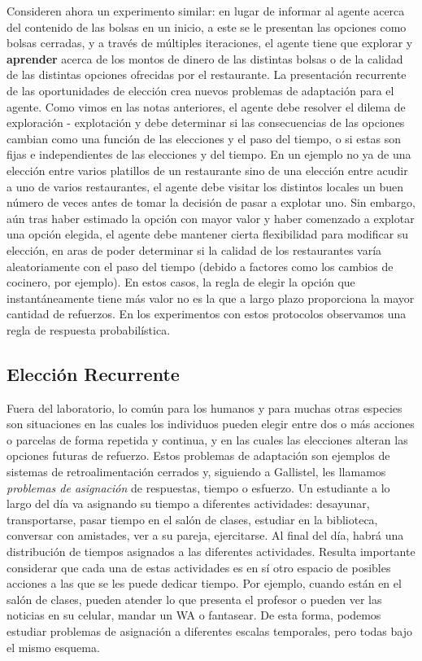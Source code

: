 \documentclass[
  a4paper,
  DIV=11,
  numbers=noendperiod]{scrreprt}
\begin{document}
Consideren ahora un experimento similar: en lugar de informar al agente
acerca del contenido de las bolsas en un inicio, a este se le presentan
las opciones como bolsas cerradas, y a través de múltiples iteraciones,
el agente tiene que explorar y \textbf{aprender} acerca de los montos de
dinero de las distintas bolsas o de la calidad de las distintas opciones
ofrecidas por el restaurante. La presentación recurrente de las
oportunidades de elección crea nuevos problemas de adaptación para el
agente. Como vimos en las notas anteriores, el agente debe resolver el
dilema de exploración - explotación y debe determinar si las
consecuencias de las opciones cambian como una función de las elecciones
y el paso del tiempo, o si estas son fijas e independientes de las
elecciones y del tiempo. En un ejemplo no ya de una elección entre
varios platillos de un restaurante sino de una elección entre acudir a
uno de varios restaurantes, el agente debe visitar los distintos locales
un buen número de veces antes de tomar la decisión de pasar a explotar
uno. Sin embargo, aún tras haber estimado la opción con mayor valor y
haber comenzado a explotar una opción elegida, el agente debe mantener
cierta flexibilidad para modificar su elección, en aras de poder
determinar si la calidad de los restaurantes varía aleatoriamente con el
paso del tiempo (debido a factores como los cambios de cocinero, por
ejemplo). En estos casos, la regla de elegir la opción que
instantáneamente tiene más valor no es la que a largo plazo proporciona
la mayor cantidad de refuerzos. En los experimentos con estos protocolos
observamos una regla de respuesta probabilística.

\subsection{Elección Recurrente}\label{elecciuxf3n-recurrente}

Fuera del laboratorio, lo común para los humanos y para muchas otras
especies son situaciones en las cuales los individuos pueden elegir
entre dos o más acciones o parcelas de forma repetida y continua, y en
las cuales las elecciones alteran las opciones futuras de refuerzo.
Estos problemas de adaptación son ejemplos de sistemas de
retroalimentación cerrados y, siguiendo a Gallistel, les llamamos
\emph{problemas de asignación} de respuestas, tiempo o esfuerzo. Un
estudiante a lo largo del día va asignando su tiempo a diferentes
actividades: desayunar, transportarse, pasar tiempo en el salón de
clases, estudiar en la biblioteca, conversar con amistades, ver a su
pareja, ejercitarse. Al final del día, habrá una distribución de tiempos
asignados a las diferentes actividades. Resulta importante considerar
que cada una de estas actividades es en sí otro espacio de posibles
acciones a las que se les puede dedicar tiempo. Por ejemplo, cuando
están en el salón de clases, pueden atender lo que presenta el profesor
o pueden ver las noticias en su celular, mandar un WA o fantasear. De
esta forma, podemos estudiar problemas de asignación a diferentes
escalas temporales, pero todas bajo el mismo esquema.
\end{document}
